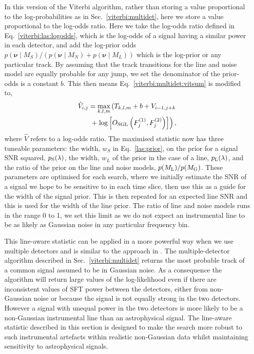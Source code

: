 In this version of the Viterbi algorithm, rather than storing a value proportional to the log-probabilities as in Sec.~\ref{viterbi:multidet}, here we store a value proportional to the log-odds ratio.
Here we take the log-odds ratio defined in Eq.~\ref{viterbi:las:logodds}, which is the log-odds of a signal having a similar power in each detector, and add the log-prior odds $p(\bm{\nu} \mid M_S)/(p(\bm{\nu} \mid M_N) + p(\bm{\nu} \mid M_L))$ which is the log-prior or any particular track. By assuming that the track transitions for the line and noise model are equally probable for any jump, we set the denominator of the prior-odds is a constant $b$.
This then means Eq.~\ref{viterbi:multidet:vitsum} is modified to,
\begin{equation}
\begin{split}
\label{lineaware:stat}
\hat{V}_{i,j} = \max_{k,l,m}\left(T_{k,l,m} + b + V_{i-1,j+k}   \right. \\
 + \left.  \log\left[O_{\rm{SGL}}\left(F^{(1)}_{j},F^{(2)}_{j}\right)\right]\right),
\end{split}
\end{equation}
%
where $\hat{V}$ refers to a log-odds ratio.
The maximised statistic now has three tuneable parameters: the width, $w_S$ in Eq.~\ref{las:prior}, on the prior for a signal \ac{SNR} squared, $p_{\rm S}(\lambda)$, the width, $w_L$ of the prior in the case of a line, $p_{\rm L}(\lambda)$, and the ratio of the prior on the line and noise models, $p({M_{\rm L}})/p({M_{\rm G}})$.  These parameters are optimised for each search, where we initially estimate the \ac{SNR} of a signal we hope to be sensitive to in each time slice, then use this as a guide for the width of the signal prior. This is then repeated for an expected line \ac{SNR} and this is used for the width of the line prior. The ratio of line and noise models runs in the range 0 to 1, we set this limit as we do not expect an instrumental line to be as likely as Gaussian noise in any particular frequency bin.

%
%
This line-aware statistic can be applied in a more powerful way when we use multiple detectors and is similar to the approach in \cite{PhysRevD.89.064023}. The multiple-detector algorithm described in Sec.~\ref{viterbi:multidet} returns the most probable track of a common signal assumed to be in Gaussian noise. As a consequence the algorithm will return large values of the log-likelihood even if there are inconsistent values of \ac{SFT} power between the detectors, either from non-Gaussian noise or because the signal is not equally strong in the two detectors. However a signal with unequal power in the two detectors is more likely to be a non-Gaussian instrumental line than an astrophysical signal. The line-aware statistic described in this section is designed to make the search more robust to such instrumental artefacts within realistic non-Gaussian data whilst maintaining sensitivity to astrophysical signals.

